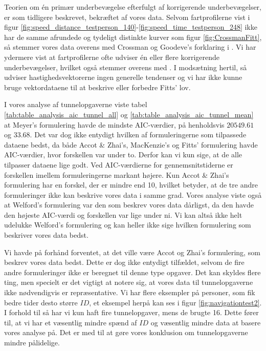 Teorien om én primær underbevægelse efterfulgt af korrigerende underbevægelser, er som tidligere beskrevet, bekræftet af vores data. Selvom fartprofilerne vist i figur \ref{fig:speed_distance_testperson_140}-\ref{fig:speed_time_testperson_248} ikke har de samme afrundede og tydeligt distinkte kurver som figur \ref{fig:CrossmanFitt}, så stemmer vores data overens med Crossman og Goodeve's forklaring i \cite{crossman1983}. Vi har ydermere vist at fartprofilerne ofte udviser én eller flere korrigerende underbevægelser, hvilket også stemmer overens med \cite{crossman1983}. I modsætning hertil, så udviser hastighedsvektorerne ingen generelle tendenser og vi har ikke kunne bruge vektordataene til at beskrive eller forbedre Fitts' lov.

I vores analyse af tunnelopgaverne viste tabel \ref{tab:table_analysis_aic_tunnel_all} og \ref{tab:table_analysis_aic_tunnel_mean} at Meyer's formulering havde de mindste AIC-værdier, på henholdsvis $20549.61$ og $33.68$. Det var dog ikke entydigt hvilken af formuleringerne som tilpassede dataene bedst, da både Accot \& Zhai's, MacKenzie's og Fitts' formulering havde AIC-værdier, hvor forskellen var under to. Derfor kan vi kun sige, at de alle tilpasser dataene lige godt. Ved AIC-værdierne for gennemsnitstiderne er forskellen imellem formuleringerne markant højere. Kun Accot \& Zhai's formulering har en forskel, der er mindre end 10, hvilket betyder, at de tre andre formuleringer ikke kan beskrive vores data i samme grad. Vores analyse viste også at Welford's formulering var den som beskrev vores data dårligst, da den havde den højeste AIC-værdi og forskellen var lige under ni. Vi kan altså ikke helt udelukke Welford's formulering og kan heller ikke sige hvilken formulering som beskriver vores data bedst.

Vi havde på forhånd forventet, at det ville være Accot og Zhai's formulering, som beskrev vores data bedst. Dette er dog ikke entydigt tilfældet, selvom de fire andre formuleringer ikke er beregnet til denne type opgaver. Det kan skyldes flere ting, men specielt er det vigtigt at notere sig, at vores data til tunnelopgaverne ikke nødvendigvis er repræsentative. Vi har flere eksempler på personer, som fik bedre tider desto større $ID$, et eksempel herpå kan ses i figur \ref{fig:navigationtest2}. I forhold til \cite{accot1997} så har vi kun haft fire tunnelopgaver, mens de brugte 16. Dette fører til, at vi har et væsentlig mindre spænd af $ID$ og væsentlig mindre data at basere vores analyse på. Det er med til at gøre vores konklusion om tunnelopgaverne mindre pålidelige.

